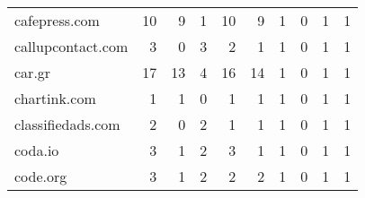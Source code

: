 \begin{tabular}{lrrrrrrrrr}
              cafepress.com &                               10 &                                  9 &                                      1 &                           10 &                           9 &                                   1 &                                      0 &                             1 &                            1 \\
          callupcontact.com &                                3 &                                  0 &                                      3 &                            2 &                           1 &                                   1 &                                      0 &                             1 &                            1 \\
                     car.gr &                               17 &                                 13 &                                      4 &                           16 &                          14 &                                   1 &                                      0 &                             1 &                            1 \\
               chartink.com &                                1 &                                  1 &                                      0 &                            1 &                           1 &                                   1 &                                      0 &                             1 &                            1 \\
          classifiedads.com &                                2 &                                  0 &                                      2 &                            1 &                           1 &                                   1 &                                      0 &                             1 &                            1 \\
                    coda.io &                                3 &                                  1 &                                      2 &                            3 &                           1 &                                   1 &                                      0 &                             1 &                            1 \\
                   code.org &                                3 &                                  1 &                                      2 &                            2 &                           2 &                                   1 &                                      0 &                             1 &                            1 \\

\end{tabular}
